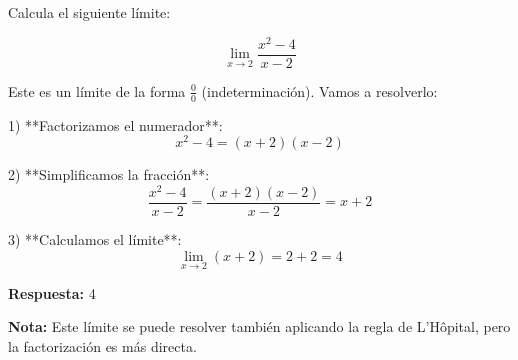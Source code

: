 \begin{ejercicio}[
  id=CAL_LIM_001,
  materia=calculo,
  capitulo=limites,
  nivel=basico,
  procedencia="Examen CEPRE 2023",
  visibilidad=true,
  libros={calculo1, calculo_basico},
  youtube_url="",
  mostrar_solucion=true,
  libro_promocion=""
]
Calcula el siguiente límite:

$$\lim_{x \to 2} \frac{x^2 - 4}{x - 2}$$

\begin{solucion}
Este es un límite de la forma $\frac{0}{0}$ (indeterminación). Vamos a resolverlo:

1) **Factorizamos el numerador**:
   $$x^2 - 4 = (x + 2)(x - 2)$$

2) **Simplificamos la fracción**:
   $$\frac{x^2 - 4}{x - 2} = \frac{(x + 2)(x - 2)}{x - 2} = x + 2$$

3) **Calculamos el límite**:
   $$\lim_{x \to 2} (x + 2) = 2 + 2 = 4$$

\textbf{Respuesta:} 4

\textbf{Nota:} Este límite se puede resolver también aplicando la regla de L'Hôpital, pero la factorización es más directa.
\end{solucion}
\end{ejercicio} 